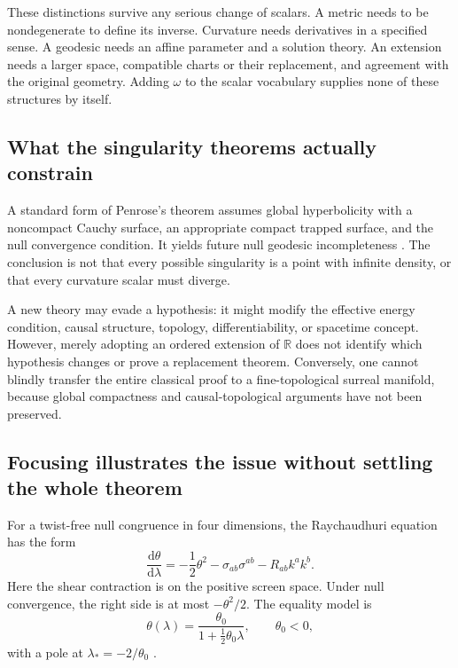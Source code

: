 \documentclass[11pt,a4paper]{article}
\numberwithin{equation}{section}
\theoremstyle{definition}
\theoremstyle{remark}
\newcommand{\R}{\mathbb R}
\newcommand{\dd}{\mathrm d}
\begin{document}
These distinctions survive any serious change of scalars. A metric needs to be
nondegenerate to define its inverse. Curvature needs derivatives in a specified
sense. A geodesic needs an affine parameter and a solution theory. An extension
needs a larger space, compatible charts or their replacement, and agreement
with the original geometry. Adding $\omega$ to the scalar vocabulary supplies
none of these structures by itself.

\subsection{What the singularity theorems actually constrain}
A standard form of Penrose's theorem assumes global hyperbolicity with a
noncompact Cauchy surface, an appropriate compact trapped surface, and the null
convergence condition. It yields future null geodesic incompleteness
\cite{Penrose}. The conclusion is not that every possible singularity is a
point with infinite density, or that every curvature scalar must diverge.

A new theory may evade a hypothesis: it might modify the effective energy
condition, causal structure, topology, differentiability, or spacetime concept.
However, merely adopting an ordered extension of $\R$ does not identify which
hypothesis changes or prove a replacement theorem. Conversely, one cannot
blindly transfer the entire classical proof to a fine-topological surreal
manifold, because global compactness and causal-topological arguments have not
been preserved.

\subsection{Focusing illustrates the issue without settling the whole theorem}
For a twist-free null congruence in four dimensions, the Raychaudhuri equation
has the form
\begin{equation}\label{eq:ray}
\frac{\dd\theta}{\dd\lambda}
 =-\frac12\theta^2-\sigma_{ab}\sigma^{ab}-R_{ab}k^ak^b.
\end{equation}
Here the shear contraction is on the positive screen space. Under null
convergence, the right side is at most $-\theta^2/2$. The equality model is
\begin{equation}\label{eq:raymodel}
\theta(\lambda)=\frac{\theta_0}{1+\tfrac12\theta_0\lambda},
\qquad \theta_0<0,
\end{equation}
with a pole at $\lambda_*=-2/\theta_0$ \cite{Raychaudhuri,Witten}.
\end{document}
